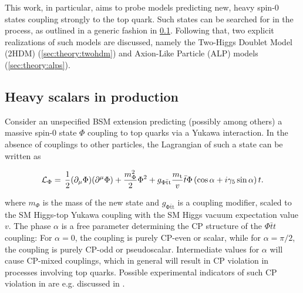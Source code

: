 This work, in particular, aims to probe models predicting new, heavy spin-0 states coupling strongly to the top quark. Such states can be searched for in the \pptt process, as outlined in a generic fashion in \cref{sec:theory:ah}. Following that, two explicit realizations of such models are discussed, namely the Two-Higgs Doublet Model (2HDM) (\cref{sec:theory:twohdm}) and Axion-Like Particle (ALP) models (\cref{sec:theory:alps}).

\subsection{Heavy scalars in \ttbartitle production}
\label{sec:theory:ah}

Consider an unspecified BSM extension predicting (possibly among others) a massive spin-0 state $\Phi$ coupling to top quarks via a Yukawa interaction. In the absence of couplings to other particles, the Lagrangian of such a state can be written as~\cite{Maltoni:2024tul}

\begin{equation}
\label{eq:theory:lag_ah}
    \mathcal{L}_{\Phi} = \, \frac{1}{2} (\partial_\mu \Phi ) (\partial^\mu \Phi ) +\frac{m_{\Phi}^2}{2} \Phi^2 
    + g_{\mathrm{\Phi \bar{t} t}} \frac{m_{\mathrm{t}}}{v} \bar{t} \Phi \left( \cos{\alpha} + i \gamma_5 \sin{\alpha} \right) t .
\end{equation}

\noindent where $m_\Phi$ is the mass of the new state and $g_{\mathrm{\Phi \bar{t} t}}$ is a coupling modifier, scaled to the SM Higgs-top Yukawa coupling with the SM Higgs vacuum expectation value $v$. The phase $\alpha$ is a free parameter determining the CP structure of the $\Phi \bar{t} t$ coupling: For $\alpha = 0$, the coupling is purely CP-even or scalar, while for $\alpha = \pi/2$, the coupling is purely CP-odd or pseudoscalar. Intermediate values for $\alpha$ will cause CP-mixed couplings, which in general will result in  CP violation in processes involving top quarks. Possible experimental indicators of such CP violation in \pptt are e.g. discussed in .

